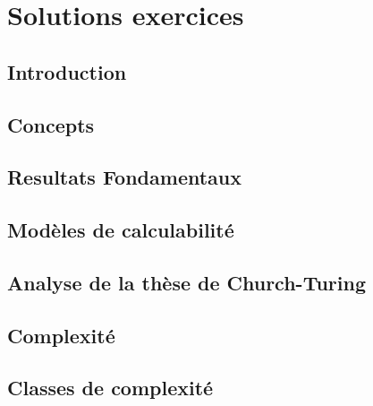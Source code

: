 
\chapter{Solutions exercices}
\label{ch:solExer}

%

\section{Introduction}





\section{Concepts}




\section{Resultats Fondamentaux}




\section{Modèles de calculabilité}




\section{Analyse de la thèse de Church-Turing}




\section{Complexité}




\section{Classes de complexité}

